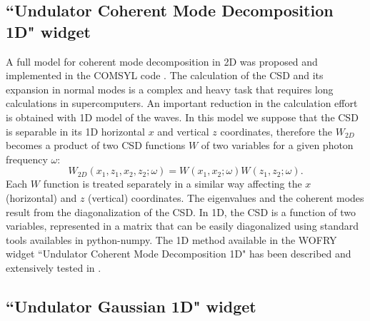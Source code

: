 \documentclass{iopconfser}
\newcommand{\todo}[1]{{\color{red}[TODO: "#1'']}}
\begin{document}
\subsection{``Undulator Coherent Mode Decomposition 1D" widget}
\label{sec:CMD}

A full model for coherent mode decomposition in 2D was proposed and implemented in the COMSYL code \cite{glass2017}. The calculation of the CSD and its expansion in normal modes is a complex and heavy task that requires long calculations in supercomputers. 
An important reduction in the calculation effort is obtained with 1D model of the waves. In this model we suppose that the CSD is separable in its 1D horizontal $x$ and vertical $z$ coordinates, therefore the $W_{2D}$ becomes a product of two CSD functions $W$ of two variables for a given photon frequency $\omega$:
\begin{equation}
W_{2D}(x_1,z_1,x_2,z_2;\omega) = W(x_1,x_2;\omega) W(z_1,z_2;\omega).
\label{eq:CSD_2D}
\end{equation}
Each $W$ function is treated separately in a similar way affecting the $x$ (horizontal) and $z$ (vertical) coordinates.
The eigenvalues and the coherent modes result from the diagonalization of the CSD.  In 1D, the CSD is a function of two variables, represented in a matrix that can be easily diagonalized using standard tools availables in python-numpy. 
The 1D method  available in the WOFRY widget ``Undulator Coherent Mode Decomposition 1D" has been described and extensively tested in \cite{SanchezdelRio2022CMD}.

\subsection{``Undulator Gaussian 1D" widget}
\label{sec:undulatorG}
\end{document}
